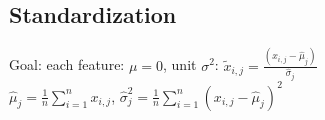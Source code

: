 
\subsection*{Standardization}
Goal: each feature: $\mu = 0$, unit $\sigma^2$: $\tilde{x}_{i,j} = \frac{(x_{i,j}-\hat{\mu}_j)}{\hat{\sigma}_j}$\\
$\hat{\mu}_j = \frac{1}{n}\sum_{i=1}^n x_{i,j}$, $\hat{\sigma}_j^2 = \frac{1}{n}\sum_{i=1}^n {(x_{i,j}-\hat{\mu}_j)}^2$ 




